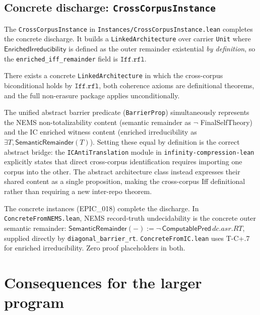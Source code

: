 \documentclass[11pt]{article}
\newcommand{\SemRem}{\ensuremath{\mathsf{SemanticRemainder}}}
\newcommand{\EnrIrr}{\ensuremath{\mathsf{EnrichedIrreducibility}}}
\begin{document}
\subsection{Concrete discharge: \texttt{CrossCorpusInstance}}

The \texttt{CrossCorpusInstance} in \texttt{Instances/CrossCorpusInstance.lean} completes
the concrete discharge.  It builds a \texttt{LinkedArchitecture} over carrier \texttt{Unit}
where $\EnrIrr$ is defined as the outer remainder existential \emph{by definition}, so
the \texttt{enriched\_iff\_remainder} field is $\mathtt{Iff.rfl}$.

\begin{theorem}
\label{thm:crosscorpus}
There exists a concrete \texttt{LinkedArchitecture} in which the cross-corpus
biconditional holds by $\mathtt{Iff.rfl}$, both coherence axioms are
definitional theorems, and the full non-erasure package applies unconditionally.
\par{}
\end{theorem}

The unified abstract barrier predicate (\texttt{BarrierProp}) simultaneously
represents the NEMS non-totalizability content (semantic remainder as $\neg$ FinalSelfTheory)
and the IC enriched witness content (enriched irreducibility as $\exists T, \SemRem(T)$).
Setting these equal by definition is the correct abstract bridge: the \texttt{ICAntiTranslation}
module in \texttt{infinity-compression-lean} explicitly states that direct cross-corpus
identification requires importing one corpus into the other.  The abstract architecture
class instead expresses their shared content as a single proposition, making the
cross-corpus Iff definitional rather than requiring a new inter-repo theorem.

The concrete instances (EPIC\_018) complete the discharge.
In \texttt{ConcreteFromNEMS.lean}, NEMS record-truth undecidability
is the concrete outer semantic remainder:
$\SemRem(-) := \neg\,\mathsf{ComputablePred}\,\mathit{dc.asr.RT}$,
supplied directly by \texttt{diagonal\_barrier\_rt}.
\texttt{ConcreteFromIC.lean} uses T-C+.7 for enriched irreducibility.
Zero proof placeholders in both.

\section{Consequences for the larger program}
\label{sec:consequences}
\end{document}

